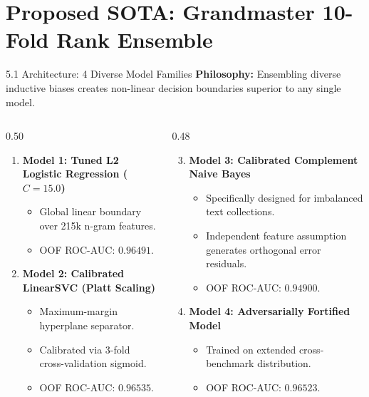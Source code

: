 \documentclass[aspectratio=169]{beamer}
\begin{document}
\section{Proposed SOTA: Grandmaster 10-Fold Rank Ensemble}

\begin{frame}{5.1 Architecture: 4 Diverse Model Families}
\textbf{Philosophy:} Ensembling diverse inductive biases creates non-linear decision boundaries superior to any single model.

\vspace{0.2cm}
\begin{columns}[T]
\begin{column}{0.50\textwidth}
\begin{enumerate}
    \item \textbf{Model 1: Tuned L2 Logistic Regression ($C=15.0$)}
    \begin{itemize}
        \item Global linear boundary over 215k n-gram features.
        \item OOF ROC-AUC: $\mathbf{0.96491}$.
    \end{itemize}
    \item \textbf{Model 2: Calibrated LinearSVC (Platt Scaling)}
    \begin{itemize}
        \item Maximum-margin hyperplane separator.
        \item Calibrated via 3-fold cross-validation sigmoid.
        \item OOF ROC-AUC: $\mathbf{0.96535}$.
    \end{itemize}
\end{enumerate}
\end{column}

\begin{column}{0.48\textwidth}
\begin{enumerate}
    \setcounter{enumi}{2}
    \item \textbf{Model 3: Calibrated Complement Naive Bayes}
    \begin{itemize}
        \item Specifically designed for imbalanced text collections.
        \item Independent feature assumption generates orthogonal error residuals.
        \item OOF ROC-AUC: $\mathbf{0.94900}$.
    \end{itemize}
    \item \textbf{Model 4: Adversarially Fortified Model}
    \begin{itemize}
        \item Trained on extended cross-benchmark distribution.
        \item OOF ROC-AUC: $\mathbf{0.96523}$.
    \end{itemize}
\end{enumerate}
\end{column}
\end{columns}
\end{frame}
\end{document}
